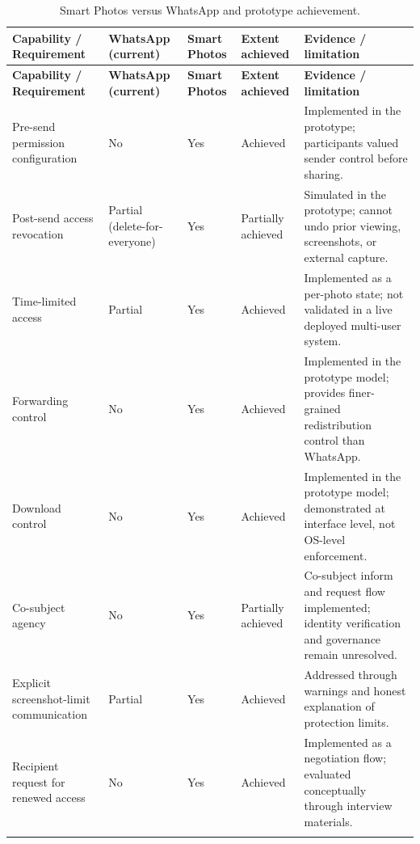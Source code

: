 \begin{xltabular}{\textwidth}{|p{3.5cm}|p{1.9cm}|p{1.3cm}|p{2.4cm}|X|}
    \hline
    \textbf{Capability / Requirement} & \textbf{WhatsApp (current)} & \textbf{Smart Photos} & \textbf{Extent achieved} & \textbf{Evidence / limitation} \\
    \hline
    \endfirsthead

    \hline
    \textbf{Capability / Requirement} & \textbf{WhatsApp (current)} & \textbf{Smart Photos} & \textbf{Extent achieved} & \textbf{Evidence / limitation} \\
    \hline
    \endhead
    \hline
    Pre-send permission configuration & No & Yes & Achieved & Implemented in the prototype; participants valued sender control before sharing. \\
    \hline
    Post-send access revocation  & Partial (delete-for-everyone) & Yes & Partially achieved & Simulated in the prototype; cannot undo prior viewing, screenshots, or external capture. \\
    \hline
    Time-limited access  & Partial & Yes & Achieved & Implemented as a per-photo state; not validated in a live deployed multi-user system. \\
    \hline
    Forwarding control  & No & Yes & Achieved & Implemented in the prototype model; provides finer-grained redistribution control than WhatsApp. \\
    \hline
    Download control& No & Yes & Achieved & Implemented in the prototype model; demonstrated at interface level, not OS-level enforcement. \\
    \hline
    Co-subject agency & No & Yes & Partially achieved & Co-subject inform and request flow implemented; identity verification and governance remain unresolved. \\
    \hline
    Explicit screenshot-limit communication & Partial & Yes & Achieved & Addressed through warnings and honest explanation of protection limits. \\
    \hline
    Recipient request for renewed access & No & Yes & Achieved & Implemented as a negotiation flow; evaluated conceptually through interview materials. \\
    \hline
    \caption{Smart Photos versus WhatsApp and prototype achievement.}
    \label{tab:whatsapp-smartphotos-comparison}\\
    \end{xltabular}
    

